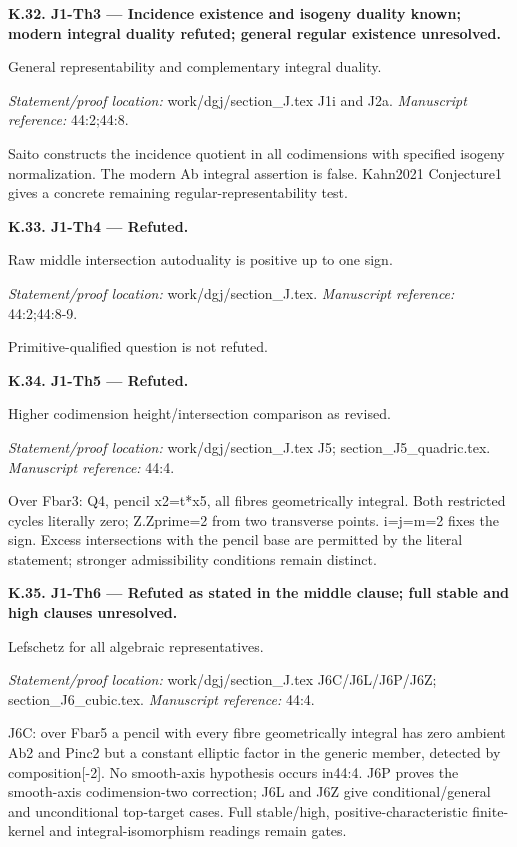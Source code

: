 \par\medskip\noindent\textbf{K.32. J1-Th3 --- Incidence existence and isogeny duality known; modern integral duality refuted; general regular existence unresolved.}\par
General representability and complementary integral duality.
\par\emph{Statement/proof location:} work/dgj/section\_J.tex J1i and J2a.
\emph{Manuscript reference:} 44:2;44:8.
\par Saito constructs the incidence quotient in all codimensions with specified isogeny normalization. The modern Ab integral assertion is false. Kahn2021 Conjecture1 gives a concrete remaining regular-representability test.
\par\medskip\noindent\textbf{K.33. J1-Th4 --- Refuted.}\par
Raw middle intersection autoduality is positive up to one sign.
\par\emph{Statement/proof location:} work/dgj/section\_J.tex.
\emph{Manuscript reference:} 44:2;44:8-9.
\par Primitive-qualified question is not refuted.
\par\medskip\noindent\textbf{K.34. J1-Th5 --- Refuted.}\par
Higher codimension height/intersection comparison as revised.
\par\emph{Statement/proof location:} work/dgj/section\_J.tex J5; section\_J5\_quadric.tex.
\emph{Manuscript reference:} 44:4.
\par Over Fbar3: Q4, pencil x2=t*x5, all fibres geometrically integral. Both restricted cycles literally zero; Z.Zprime=2 from two transverse points. i=j=m=2 fixes the sign. Excess intersections with the pencil base are permitted by the literal statement; stronger admissibility conditions remain distinct.
\par\medskip\noindent\textbf{K.35. J1-Th6 --- Refuted as stated in the middle clause; full stable and high clauses unresolved.}\par
Lefschetz for all algebraic representatives.
\par\emph{Statement/proof location:} work/dgj/section\_J.tex J6C/J6L/J6P/J6Z; section\_J6\_cubic.tex.
\emph{Manuscript reference:} 44:4.
\par J6C: over Fbar5 a pencil with every fibre geometrically integral has zero ambient Ab2 and Pinc2 but a constant elliptic factor in the generic member, detected by composition[-2]. No smooth-axis hypothesis occurs in44:4. J6P proves the smooth-axis codimension-two correction; J6L and J6Z give conditional/general and unconditional top-target cases. Full stable/high, positive-characteristic finite-kernel and integral-isomorphism readings remain gates.
